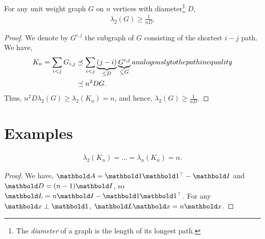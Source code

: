 \begin{lem}
For any unit weight graph $G$ on $n$ vertices with diameter\footnote{The \emph{diameter} of a graph is the length of its longest path.} $D$, \begin{align}
    \lambda_2(G) \geq \frac{1}{nD}.
\end{align}
\end{lem}
\begin{proof} We denote by $G^{i,j}$ the subgraph of $G$ consisting of the shortest $i-j$ path. We have, \begin{align*}
    K_n = \sum_{i < j} G_{i,j} &\preceq \sum_{i<j} \underbrace{(j-i)}_{\leq D} \underbrace{G^{i,j}}_{\subseteq G} \margintag{analogously to the path inequality} \\
    &\preceq n^2 D G.
\end{align*} Thus, $n^2 D \lambda_2(G) \geq \lambda_2(K_n) = n$, and hence, $\lambda_2(G) \geq \frac{1}{nD}$.
\end{proof}

\section{Examples}

\begin{lem} \begin{align}
    \lambda_2(K_n) = \dots = \lambda_n(K_n) = n.
\end{align}
\end{lem}
\begin{proof} We have, $\mA = \vOne\trans{\vOne} - \mI$ and $\mD = (n-1)\mI$, so $\mL = n\mI - \vOne\trans{\vOne}$. For any $\vx \perp \vOne$, $\mL\vx = n\vx$.
\end{proof}

